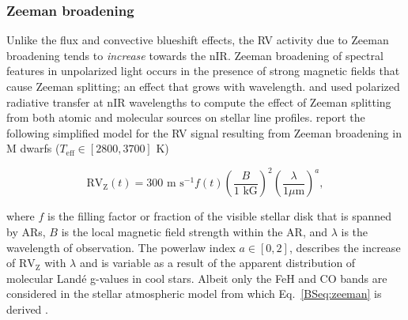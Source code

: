\subsubsection{Zeeman broadening}
Unlike the flux and convective blueshift effects, the RV activity due to Zeeman broadening tends to
\emph{increase} towards the nIR. Zeeman broadening of spectral features in unpolarized light occurs in
the presence of strong magnetic
fields that cause Zeeman splitting; an effect that grows with wavelength. \cite{reiners13} and
\cite{hebrard14} used polarized
radiative transfer at nIR wavelengths to compute the effect of Zeeman splitting from both atomic and
molecular sources on stellar line profiles. \cite{reiners13} report the following simplified model for the
RV signal resulting from Zeeman broadening in M dwarfs ($T_{\text{eff}} \in [2800, 3700]$ K)

\begin{equation}
  \text{RV}_{\text{Z}}(t) = 300 \text{ m s}^{-1} f(t) \left( \frac{B}{\text{1 kG}} \right)^2
  \left( \frac{\lambda}{1 \mu\text{m}} \right)^a, \label{BSeq:zeeman}
\end{equation}

\noindent where $f$ is the filling factor or fraction of the visible stellar disk that is
spanned by ARs, $B$
is the local magnetic field strength within the AR, and $\lambda$ is the wavelength of
observation. The powerlaw index $a \in [0,2]$, describes the increase of $\text{RV}_{\text{Z}}$ with
$\lambda$ and is variable as a result of the apparent distribution of molecular Land\'{e} g-values
in cool stars. Albeit only the FeH and CO bands are considered in the stellar atmospheric model from
which Eq.~\ref{BSeq:zeeman} is derived \citep{reiners13}.

